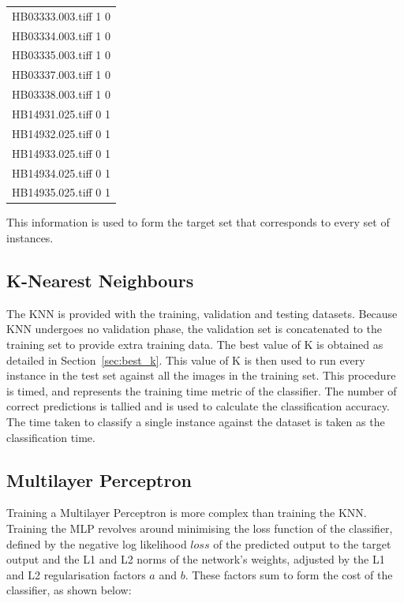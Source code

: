 \begin{center}
	\begin{tabular}{c}
		HB03333.003.tiff 1 0 \\
		HB03334.003.tiff 1 0 \\
		HB03335.003.tiff 1 0 \\
		HB03337.003.tiff 1 0 \\
		HB03338.003.tiff 1 0 \\
		HB14931.025.tiff 0 1 \\
		HB14932.025.tiff 0 1 \\
		HB14933.025.tiff 0 1 \\
		HB14934.025.tiff 0 1 \\
		HB14935.025.tiff 0 1 \\
	\end{tabular}
\end{center}

This information is used to form the target set that corresponds to every set of instances.

\subsection{K-Nearest Neighbours}
The KNN is provided with the training, validation and testing datasets. Because KNN undergoes no validation phase, the validation set is concatenated to the training set to provide extra training data. The best value of K is obtained as detailed in Section~\ref{sec:best_k}. This value of K is then used to run every instance in the test set against all the images in the training set. This procedure is timed, and represents the training time metric of the classifier. The number of correct predictions is tallied and is used to calculate the classification accuracy. The time taken to classify a single instance against the dataset is taken as the classification time.

\subsection{Multilayer Perceptron}
Training a Multilayer Perceptron is more complex than training the KNN. Training the MLP revolves around minimising the loss function of the classifier, defined by the negative log likelihood $loss$ of the predicted output to the target output and the L1 and L2 norms of the network's weights, adjusted by the L1 and L2 regularisation factors $a$ and $b$. These factors sum to form the cost of the classifier, as shown below:

